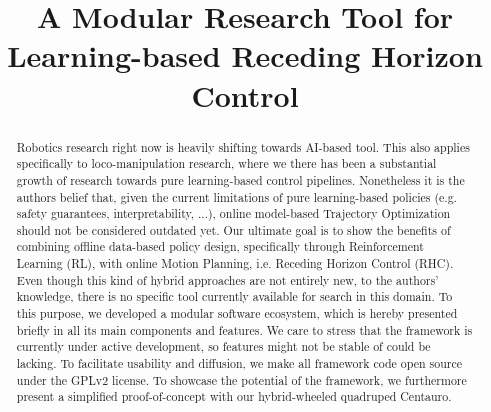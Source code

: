 \documentclass[letterpaper, 10 pt, conference]{ieeeconf}  %
\begin{document}
	
\title{\LARGE \bf
A Modular Research Tool for Learning-based Receding Horizon Control
}

\author{
}

\maketitle

\begingroup\renewcommand{}
\endgroup

\begingroup\renewcommand{}
\endgroup

\begingroup\renewcommand{}
\endgroup

\setlength{\textfloatsep}{12.0pt plus 8.0pt minus .0pt}

\begin{abstract}
Robotics research right now is heavily shifting towards AI-based tool. This also applies specifically to loco-manipulation research, where we there has been a substantial growth of research towards pure learning-based control pipelines. Nonetheless it is the authors belief that, given the current limitations of pure learning-based policies (e.g. safety guarantees, interpretability, ...), online model-based Trajectory Optimization should not be considered outdated yet. Our ultimate goal is to show the benefits of combining offline data-based policy design, specifically through Reinforcement Learning (RL), with online Motion Planning, i.e. Receding Horizon Control (RHC). Even though this kind of hybrid approaches are not entirely new, to the authors' knowledge, there is no specific tool currently available for search in this domain. To this purpose, we developed a modular software ecosystem, which is hereby presented briefly in all its main components and features. We care to stress that the framework is currently under active development, so features might not be stable of could be lacking. To facilitate usability and diffusion, we make all framework code open source under the GPLv2 license. To showcase the potential of the framework, we furthermore present a simplified proof-of-concept with our hybrid-wheeled quadruped Centauro.
\end{abstract}
\end{document}
